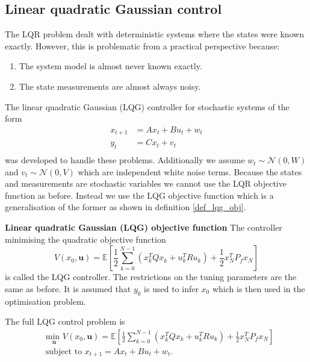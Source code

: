\subsection{Linear quadratic Gaussian control}
\label{sec_lqg_lit}
The LQR problem dealt with deterministic systems where the states were known exactly. However, this is problematic from a practical perspective because:
\begin{enumerate}
\item
The system model is almost never known exactly.
\item
The state measurements are almost always noisy.
\end{enumerate}
The linear quadratic Gaussian (LQG) controller for stochastic systems of the form
\begin{equation}
\begin{aligned}
x_{t+1} &= Ax_t+ Bu_t + w_t \\
y_t &= Cx_t +v_t \\
\end{aligned}
\label{eq_lqg_ss}
\end{equation}
was developed to handle these problems. Additionally we assume  $w_t \sim \mathcal{N}(0, W)$ and $v_t \sim \mathcal{N}(0, V)$ which are independent white noise terms. Because the states and measurements are stochastic variables we cannot use the LQR objective function as before. Instead we use the LQG objective function which is a generalisation of the former as shown in definition \ref{def_lqg_obj}.
\begin{defn}
\textbf{Linear quadratic Gaussian (LQG) objective function} The controller minimising the quadratic objective function 
\begin{equation}
V(x_0, \mathbf{u}) = \mathbb{E}\left[ \frac{1}{2}\sum_{k=0}^{N-1} \left( x_k^TQx_k + u_k^TRu_k \right) + \frac{1}{2}x_N^TP_fx_N \right]
\label{eq_lqg_obj}
\end{equation}
is called the LQG controller. The restrictions on the tuning parameters are the same as before. It is assumed that $y_0$ is used to infer $x_0$ which is then used in the optimisation problem.
\label{def_lqg_obj}
\end{defn}
The full LQG control problem is 
\begin{equation}
\begin{aligned}
&\underset{\mathbf{u}}{\text{min }} V(x_0, \mathbf{u}) = \mathbb{E}\left[ \frac{1}{2}\sum_{k=0}^{N-1} \left( x_k^TQx_k + u_k^TRu_k \right) + \frac{1}{2}x_N^TP_fx_N \right] \\
& \text{subject to } x_{t+1}=Ax_t+Bu_t + w_t.
\end{aligned}
\label{eq_lqg_problem}
\end{equation}
